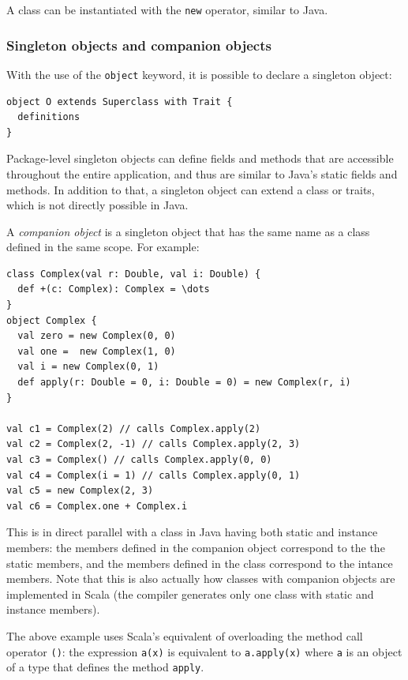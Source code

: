 A class can be instantiated with the \texttt{new} operator, similar to Java.

\subsubsection{Singleton objects and companion objects}

With the use of the \texttt{object} keyword, it is possible to declare a singleton object:
\begin{lstlisting}
object O extends Superclass with Trait {
  definitions
}
\end{lstlisting}

Package-level singleton objects can define fields and methods that are accessible throughout the entire application, and thus are similar to Java's static fields and methods. In addition to that, a singleton object can extend a class or traits,  which is not directly possible in Java.

A \emph{companion object} is a singleton object that has the same name as a class defined in the same scope. For example:

\begin{lstlisting}
class Complex(val r: Double, val i: Double) {
  def +(c: Complex): Complex = \dots
}
object Complex {
  val zero = new Complex(0, 0)
  val one =  new Complex(1, 0)
  val i = new Complex(0, 1)
  def apply(r: Double = 0, i: Double = 0) = new Complex(r, i)
}

val c1 = Complex(2) // calls Complex.apply(2)
val c2 = Complex(2, -1) // calls Complex.apply(2, 3)
val c3 = Complex() // calls Complex.apply(0, 0)
val c4 = Complex(i = 1) // calls Complex.apply(0, 1)
val c5 = new Complex(2, 3)
val c6 = Complex.one + Complex.i
\end{lstlisting}

This is in direct parallel with a class in Java having both static and instance members: the members defined in the companion object correspond to the the static members, and the members defined in the class correspond to the intance members. Note that this is also actually how classes with companion objects are implemented in Scala (the compiler generates only one class with static and instance members).

The above example uses Scala's equivalent of overloading the method call operator \texttt{()}: the expression \texttt{a(x)} is equivalent to \texttt{a.apply(x)} where \texttt{a} is an object of a type that defines the method \texttt{apply}.

